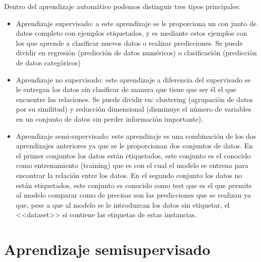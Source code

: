 Dentro del aprendizaje automático podemos distinguir tres tipos principales:
\begin{itemize}
\item Aprendizaje supervisado: a este aprendizaje se le proporciona un con junto de datos completo con ejemplos etiquetados, y es mediante estos ejemplos con los que aprende a clasificar nuevos datos o realizar predicciones. Se puede dividir en regresión (predicción de datos numéricos) o clasificación (predicción de datos categóricos)
\item Aprendizaje no supervisado: este aprendizaje a diferencia del supervisado se le entregan los datos sin clasificar de manera que tiene que ser él el que encuentre las relaciones. Se puede dividir en: clustering (agrupación de datos por su similitud) y reducción dimensional (disminuye el número de variables en un conjunto de datos sin perder información importante).
\item Aprendizaje semi-supervisado: este aprendizaje es una combinación de los dos aprendizajes anteriores ya que se le proporcionan dos conjuntos de  datos. En el primer conjuntos los datos están etiquetados, este conjunto es el conocido como entrenamiento (training) que es con el cual el modelo se entrena para encontrar la relación entre los datos. En el segundo conjunto los datos no están etiquetados, este conjunto es conocido como test que es el que permite al modelo comparar como de precisas son las predicciones que se realizan ya que, pese a que al modelo se le introduzcan los datos sin etiquetar, el <<dataset>> si contiene las etiquetas de estas instancias.
\end{itemize}

\section{Aprendizaje semisupervisado}



